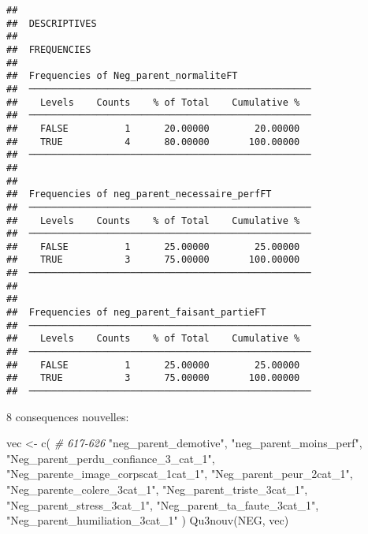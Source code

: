 \documentclass[
]{article}
\newenvironment{Shaded}{\begin{snugshade}}{\end{snugshade}}
\newcommand{\CommentTok}[1]{\textcolor[rgb]{0.56,0.35,0.01}{\textit{#1}}}
\newcommand{\FunctionTok}[1]{\textcolor[rgb]{0.00,0.00,0.00}{#1}}
\newcommand{\NormalTok}[1]{#1}
\newcommand{\OtherTok}[1]{\textcolor[rgb]{0.56,0.35,0.01}{#1}}
\newcommand{\StringTok}[1]{\textcolor[rgb]{0.31,0.60,0.02}{#1}}
\begin{document}
\begin{verbatim}
## 
##  DESCRIPTIVES
## 
##  FREQUENCIES
## 
##  Frequencies of Neg_parent_normaliteFT              
##  ────────────────────────────────────────────────── 
##    Levels    Counts    % of Total    Cumulative %   
##  ────────────────────────────────────────────────── 
##    FALSE          1      20.00000        20.00000   
##    TRUE           4      80.00000       100.00000   
##  ────────────────────────────────────────────────── 
## 
## 
##  Frequencies of neg_parent_necessaire_perfFT        
##  ────────────────────────────────────────────────── 
##    Levels    Counts    % of Total    Cumulative %   
##  ────────────────────────────────────────────────── 
##    FALSE          1      25.00000        25.00000   
##    TRUE           3      75.00000       100.00000   
##  ────────────────────────────────────────────────── 
## 
## 
##  Frequencies of neg_parent_faisant_partieFT         
##  ────────────────────────────────────────────────── 
##    Levels    Counts    % of Total    Cumulative %   
##  ────────────────────────────────────────────────── 
##    FALSE          1      25.00000        25.00000   
##    TRUE           3      75.00000       100.00000   
##  ──────────────────────────────────────────────────
\end{verbatim}

8 consequences nouvelles:

\begin{Shaded}
\begin{Highlighting}[]
\NormalTok{vec }\OtherTok{\textless{}{-}} \FunctionTok{c}\NormalTok{(   }\CommentTok{\# 617{-}626}
  \StringTok{"neg\_parent\_demotive"}\NormalTok{,}
  \StringTok{"neg\_parent\_moins\_perf"}\NormalTok{,}
  \StringTok{"Neg\_parent\_perdu\_confiance\_3\_cat\_1"}\NormalTok{,}
  \StringTok{"Neg\_parente\_image\_corpscat\_1cat\_1"}\NormalTok{,}
  \StringTok{"Neg\_parent\_peur\_2cat\_1"}\NormalTok{,}
  \StringTok{"Neg\_parente\_colere\_3cat\_1"}\NormalTok{,}
  \StringTok{"Neg\_parent\_triste\_3cat\_1"}\NormalTok{,}
  \StringTok{"Neg\_parent\_stress\_3cat\_1"}\NormalTok{,}
  \StringTok{"Neg\_parent\_ta\_faute\_3cat\_1"}\NormalTok{,}
  \StringTok{"Neg\_parent\_humiliation\_3cat\_1"}
\NormalTok{)}
\FunctionTok{Qu3nouv}\NormalTok{(NEG, vec)}
\end{Highlighting}
\end{Shaded}
\end{document}
